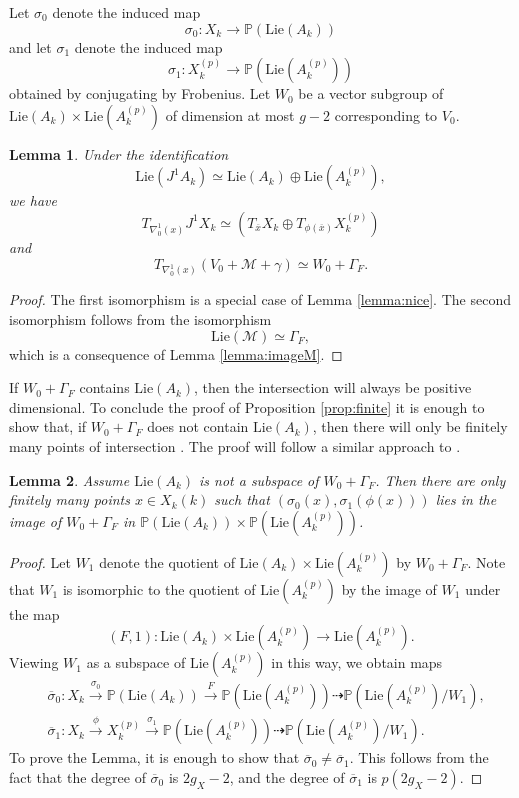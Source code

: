 \documentclass[11pt]{amsart}
\newcommand{\Lie}{\mathrm{Lie}}
\theoremstyle{plain}
\newtheorem{lemma}{Lemma}
\theoremstyle{definition}
\begin{document}
Let $\sigma _0$ denote the induced map
\[
\sigma _0 :X_k \to \mathbb{P}(\Lie (A_k ) )
\]
and let $\sigma _1$ denote the induced map
\[
\sigma _1 :X_k ^{(p)} \to \mathbb{P}(\Lie (A_k ^{(p)}) )
\]
obtained by conjugating by Frobenius.
Let $W_0$ be a vector subgroup of $\Lie (A_k )\times \Lie (A_k ^{(p)})$ of dimension at most $g-2$ corresponding to $V_0$. 
\begin{lemma}
Under the identification
\[
\Lie (J^1 A_k )\simeq \Lie (A_k )\oplus \Lie (A_k ^{(p)}), 
\]
we have
\[
T_{\nabla ^1 _0 (x)} J^1 X_k \simeq (T_{\overline{x}}X_k \oplus T_{\phi (\overline{x})}X_k ^{(p)} )
\]
and
\[
T_{\nabla ^1 _0 (x)} (V_0 +\mathcal{M}+\gamma )\simeq W_0 +\Gamma _F .
\]
\end{lemma}
\begin{proof}
The first isomorphism is a special case of Lemma \ref{lemma:nice}. The second isomorphism follows from the isomorphism
\[
\Lie (\mathcal{M})\simeq \Gamma _F ,
\]
which is a consequence of Lemma \ref{lemma:imageM}.
\end{proof}
If $W_0 +\Gamma _F $ contains $\Lie (A_k )$, then the intersection will always be positive dimensional. 
To conclude the proof of Proposition \ref{prop:finite} it is enough to show that, if $W_0 +\Gamma _F $ does not contain $\Lie (A_k )$, then there will only be finitely many points of intersection . The proof will follow a similar approach to \cite[Corollary 1.3.4]{raynaud}.
\begin{lemma}
Assume $\Lie (A_k )$ is not a subspace of $W_0 +\Gamma _F $. Then there are only finitely many points $x\in X_k (k)$ such that $(\sigma _0 (x) ,\sigma _1 (\phi (x) ))$ lies in the image of $W_0 +\Gamma _F$ in $\mathbb{P}(\Lie (A_k )) \times \mathbb{P} (\Lie (A_k ^{(p)}))$.
\end{lemma}
\begin{proof}
Let $W_1$ denote the quotient of $\Lie (A_k )\times \Lie (A_k ^{(p)})$ by $W_0 +\Gamma _F$. 
Note that $W_1$ is isomorphic to the quotient of $\Lie (A_k ^{(p)})$ by the image of $W_1$ under the map
\[
(F ,1):\Lie (A_k )\times \Lie (A_k ^{(p)})\to \Lie (A_k ^{(p)}).
\]
Viewing $W_1 $ as a subspace of $\Lie (A_k ^{(p)})$ in this way, we obtain maps
\begin{align*}
& \overline{\sigma }_0 :X_k \stackrel{\sigma _0 }{\longrightarrow }\mathbb{P}(\Lie (A_k )) \stackrel{F }{\longrightarrow }\mathbb{P}(\Lie (A_k ^{(p)})) \dashrightarrow \mathbb{P}(\Lie (A_k ^{(p)})/W_1 ), \\
& \overline{\sigma }_1 :X_k \stackrel{\phi }{\longrightarrow }X_k ^{(p)}\stackrel{\sigma _1 }{\longrightarrow }\mathbb{P}( \Lie (A_k ^{(p)})) \dashrightarrow \mathbb{P}(\Lie (A_k ^{(p)})/W_1 ).
\end{align*}
To prove the Lemma, it is enough to show that $\overline{\sigma }_0 \neq \overline{\sigma }_1 $. This follows from the fact that the degree of $\overline{\sigma }_0 $ is $2g_X-2$, and the degree of $\overline{\sigma }_1 $ is $p(2g_X-2)$.
\end{proof}
\end{document}
